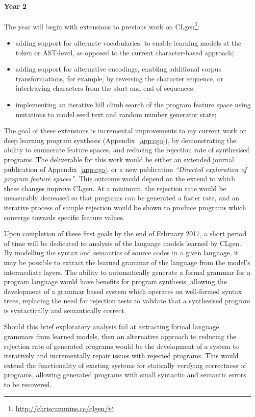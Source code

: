 \paragraph{Year 2} The year will begin with extensions to previous work on CLgen\footnote{\url{http://chriscummins.cc/clgen/}}:
%
\begin{itemize}
  \item adding support for alternate vocabularies, to enable learning models at the token or AST-level, as opposed to the current character-based approach;
  \item adding support for alternative encodings, enabling additional corpus transformations, for example, by reversing the character sequence, or interleaving characters from the start and end of sequences.
  \item implementing an iterative hill climb search of the program feature space using mutations to model seed text and random number generator state;
\end{itemize}
%
The goal of these extensions is incremental improvements to my current work on deep learning program synthesis (Appendix~\ref{app:cgo}), by demonstrating the ability to enumerate feature spaces, and reducing the rejection rate of synthesised programs. The deliverable for this work would be either an extended journal publication of Appendix~\ref{app:cgo}, or a new publication \emph{``Directed exploration of program feature spaces''}. This outcome would depend on the extend to which these changes improve CLgen. At a minimum, the rejection rate would be measurably decreased so that programs can be generated a faster rate, and an iterative process of sample rejection would be shown to produce programs which converge towards specific feature values.

Upon completion of these first goals by the end of February 2017, a short period of time will be dedicated to analysis of the language models learned by CLgen. By modelling the syntax and semantics of source codes in a given language, it may be possible to extract the learned grammar of the language from the model's intermediate layers. The ability to automatically generate a formal grammar for a program language would have benefits for program synthesis, allowing the development of a grammar based system which operates on well-formed syntax trees, replacing the need for rejection tests to validate that a synthesised program is syntactically and semantically correct.

Should this brief exploratory analysis fail at extracting formal language grammars from learned models, then an alternative approach to reducing the rejection rate of generated programs would be the development of a system to iteratively and incrementally repair issues with rejected programs. This would extend the functionality of existing systems for statically verifying correctness of programs, allowing generated programs with small syntactic and semantic errors to be recovered.

